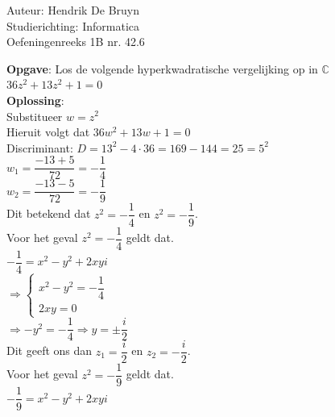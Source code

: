\documentclass[a4paper]{article}
\begin{document}
  
\noindent \large Auteur: Hendrik De Bruyn \\
\noindent \large Studierichting: Informatica\\
\noindent \large Oefeningenreeks 1B nr. 42.6\\

\medskip

\normalsize

\textbf{Opgave}: Los de volgende hyperkwadratische vergelijking op in $\mathbb{C}$ \\

$36z^2 + 13z^2 + 1 = 0$ \\

\textbf{Oplossing}: \\

Substitueer $w = z^2$ \\

Hieruit volgt dat $36w^2 + 13w + 1 = 0$ \\

Discriminant: $D = 13^2 - 4 \cdot 36 = 169 - 144 = 25 = 5^2$ \\

$w_1 = \dfrac{-13 + 5}{72} = -\dfrac{1}{4}$ \\

$w_2 = \dfrac{-13 - 5}{72} = -\dfrac{1}{9}$ \\

Dit betekend dat $z^2 = -\dfrac{1}{4}$ en $z^2 = -\dfrac{1}{9}$. \\

Voor het geval $z^2 = -\dfrac{1}{4}$ geldt dat. \\

$-\dfrac{1}{4} = x^2 - y^2 + 2xyi$ \\

$\Rightarrow \left\{\begin{array}{l}
    x^2 - y^2 = -\dfrac{1}{4} \\
    2xy = 0
\end{array}\right.$ \\

$\Rightarrow -y^2 = -\dfrac{1}{4} \Rightarrow y = \pm \dfrac{i}{2}$ \\

Dit geeft ons dan $z_1 = \dfrac{i}{2}$ en $z_2 = -\dfrac{i}{2}$. \\

Voor het geval $z^2 = -\dfrac{1}{9}$ geldt dat. \\

$-\dfrac{1}{9} = x^2 - y^2 + 2xyi$ \\
\end{document}
